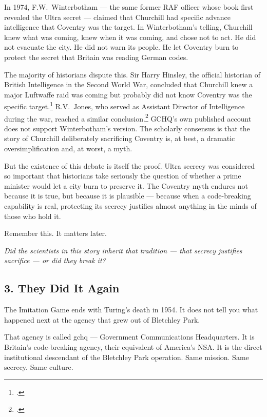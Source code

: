 In 1974, F.W.\ Winterbotham --- the same former RAF officer whose book first revealed the Ultra secret --- claimed that Churchill had specific advance intelligence that Coventry was the target. In Winterbotham's telling, Churchill knew what was coming, knew when it was coming, and chose not to act. He did not evacuate the city. He did not warn its people. He let Coventry burn to protect the secret that Britain was reading German codes.

The majority of historians dispute this. Sir Harry Hinsley, the official historian of British Intelligence in the Second World War, concluded that Churchill knew a major Luftwaffe raid was coming but probably did not know Coventry was the specific target.\footcite{hinsley1979} R.V.\ Jones, who served as Assistant Director of Intelligence during the war, reached a similar conclusion.\footcite{jones1978} GCHQ's own published account does not support Winterbotham's version. The scholarly consensus is that the story of Churchill deliberately sacrificing Coventry is, at best, a dramatic oversimplification and, at worst, a myth.

But the existence of this debate is itself the proof. Ultra secrecy was considered so important that historians take seriously the question of whether a prime minister would let a city burn to preserve it. The Coventry myth endures not because it is true, but because it is plausible --- because when a code-breaking capability is real, protecting its secrecy justifies almost anything in the minds of those who hold it.

Remember this. It matters later.

\vspace{0.5cm}
\noindent\textit{Did the scientists in this story inherit that tradition --- that secrecy justifies sacrifice --- or did they break it?}
\vspace{0.5cm}

\subsection*{3. They Did It Again}
\label{spine:cw-they-did-it-again}

The Imitation Game ends with Turing's death in 1954. It does not tell you what happened next at the agency that grew out of Bletchley Park.

That agency is called \gls{gchq} --- Government Communications Headquarters. It is Britain's code-breaking agency, their equivalent of America's NSA\@. It is the direct institutional descendant of the Bletchley Park operation. Same mission. Same secrecy. Same culture.

